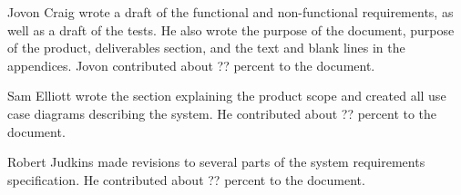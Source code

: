 \documentclass{article}
\begin{document}
Jovon Craig wrote a draft of the functional and non-functional requirements, as well as a draft of the tests. He also wrote the purpose of the document, purpose of the product, deliverables section, and the text and blank lines in the appendices. Jovon contributed about ?? percent to the document.

Sam Elliott wrote the section explaining the product scope and created all use case diagrams describing the system. He contributed about ?? percent to the document.

Robert Judkins made revisions to several parts of the system requirements specification. He contributed about ?? percent to the document.
\end{document}
